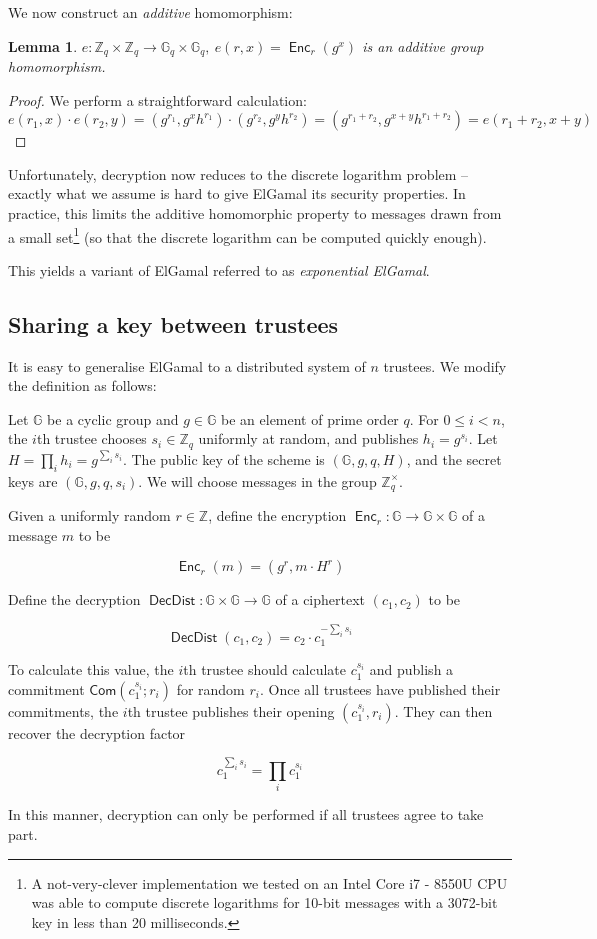 \documentclass[11pt,twoside,a4paper]{article}
\DeclareMathOperator{\Enc}{\mathsf{Enc}}
\DeclareMathOperator{\DecDist}{\mathsf{DecDist}}
\newcommand{\commit}{\mathsf{Com}}
\newtheorem{lemma}[theorem]{Lemma}
\theoremstyle{definition}
\begin{document}
We now construct an \textit{additive} homomorphism:
\begin{lemma}
    \(e:\mathbb{Z}_q\times\mathbb{Z}_q\rightarrow\mathbb{G}_q\times\mathbb{G}_q,\ e(r, x)=\Enc_r(g^x)\) is an additive group homomorphism.
\end{lemma}
\begin{proof}
    We perform a straightforward calculation:
    \[e(r_1, x)\cdot e(r_2,y)=(g^{r_1},g^xh^{r_1})\cdot(g^{r_2},g^yh^{r_2})=(g^{r_1+r_2},g^{x+y}h^{r_1+r_2})=e(r_1+r_2, x+y)\]
\end{proof}
Unfortunately, decryption now reduces to the discrete logarithm problem -- exactly what we assume is hard to give ElGamal its security properties. In practice, this limits the additive homomorphic property to messages drawn from a small set\footnote{A not-very-clever implementation we tested on an Intel Core i7 - 8550U CPU was able to compute discrete logarithms for 10-bit messages with a 3072-bit key in less than 20 milliseconds.} (so that the discrete logarithm can be computed quickly enough).

This yields a variant of ElGamal referred to as \textit{exponential ElGamal}.
\subsection{Sharing a key between trustees}
It is easy to generalise ElGamal to a distributed system of \(n\) trustees. We modify the definition as follows:
\begin{definition}
    Let \(\mathbb{G}\) be a cyclic group and \(g\in\mathbb{G}\) be an element of prime order \(q\). For \(0\leq i<n\), the \(i\)th trustee chooses \(s_i\in\mathbb{Z}_q\) uniformly at random, and publishes \(h_i=g^{s_i}\). Let \(H=\prod_i h_i=g^{\sum_i s_i}\). The public key of the scheme is \((\mathbb{G}, g, q, H)\), and the secret keys are \((\mathbb{G}, g, q, s_i)\). We will choose messages in the group \(\mathbb{Z}^\times_q\).

    Given a uniformly random \(r\in\mathbb{Z}\), define the encryption \(\Enc_r:\mathbb{G}\rightarrow\mathbb{G}\times\mathbb{G}\) of a message \(m\) to be
    
    \[\Enc_r(m) = (g^r, m\cdot H^r)\]

    Define the decryption \(\DecDist:\mathbb{G}\times\mathbb{G}\rightarrow \mathbb{G}\) of a ciphertext \((c_1, c_2)\) to be
    
    \[\DecDist(c_1,c_2)=c_2\cdot c_1^{-\sum_i s_i}\]
    
    To calculate this value, the \(i\)th trustee should calculate \(c_1^{s_i}\) and publish a commitment \(\commit\left(c_1^{s_i};r_i\right)\) for random \(r_i\). Once all trustees have published their commitments, the \(i\)th trustee publishes their opening \(\left(c_1^{s_i}, r_i\right)\). They can then recover the decryption factor
    
    \[c_1^{\sum_i s_i}=\prod_i{c_1^{s_i}}\]
\end{definition}
In this manner, decryption can only be performed if all trustees agree to take part.
\end{document}
